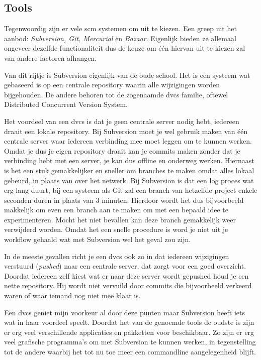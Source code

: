 \subsection{Tools}

Tegenwoordig zijn er vele {\sc scm} systemen om uit te kiezen. Een greep uit het aanbod: \emph{Subversion, Git, Mercurial} en \emph{Bazaar}. Eigenlijk bieden ze allemaal ongeveer dezelfde functionaliteit dus de keuze om \'{e}\'{e}n hiervan uit te kiezen zal van andere factoren afhangen.

Van dit rijtje is Subversion eigenlijk van de oude school. Het is een systeem wat gebaseerd is op een centrale repository waarin alle wijzigingen worden bijgehouden. De andere behoren tot de zogenaamde {\sc dvcs} familie, oftewel Distributed Concurrent Version System.

Het voordeel van een {\sc dvcs} is dat je geen centrale server nodig hebt, iedereen draait een lokale repository. Bij Subversion moet je wel gebruik maken van \'{e}\'{e}n centrale server waar iedereen verbinding mee moet leggen om te kunnen werken. Omdat je dus je eigen repository draait kan je commits maken zonder dat je verbinding hebt met een server, je kan dus offline en onderweg werken. Hiernaast is het een stuk gemakkelijker en sneller om branches te maken omdat alles lokaal gebeurd, in plaats van over het netwerk. Bij Subversion is dat een log proces wat erg lang duurt, bij een systeem als Git zal een branch van hetzelfde project enkele seconden duren in plaats van 3 minuten. Hierdoor wordt het dus bijvoorbeeld makkelijk om even een branch aan te maken om met een bepaald idee te experimenteren. Mocht het niet bevallen kan deze branch gemakkelijk weer verwijderd worden. Omdat het een snelle procedure is word je niet uit je workflow gehaald wat met Subversion wel het geval zou zijn.

In de meeste gevallen richt je een {\sc dvcs} ook zo in dat iedereen wijzigingen verstuurd (\emph{pushed}) naar een centrale server, dat zorgt voor een goed overzicht. Doordat iedereen zelf kiest wat er naar deze server wordt gepushed houd je een nette repository. Hij wordt niet vervuild door commits die bijvoorbeeld verkeerd waren of waar iemand nog niet mee klaar is.

Een {\sc dvcs} geniet mijn voorkeur al door deze punten maar Subversion heeft iets wat in haar voordeel speelt. Doordat het van de genoemde tools de oudste is zijn er erg veel verschillende applicaties en pakketten voor beschikbaar. Zo zijn er erg veel grafische programma's om met Subversion te kunnen werken, in tegenstelling tot de andere waarbij het tot nu toe meer een commandline aangelegenheid blijft.

